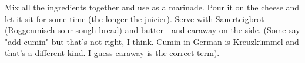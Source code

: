 Mix all the ingredients together and use as a marinade. Pour it on the cheese and let it sit for some time (the longer the juicier). Serve with Sauerteigbrot (Roggenmisch sour sough bread) and butter - and caraway on the side. (Some say "add cumin" but that's not right, I think. Cumin in German is Kreuzkümmel and that's a different kind. I guess caraway is the correct term).
